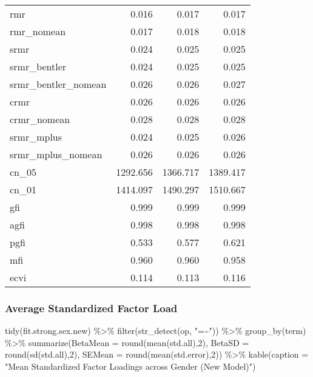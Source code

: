 \documentclass[
  letterpaper,
  DIV=11,
  numbers=noendperiod]{scrartcl}
\newenvironment{Shaded}{\begin{snugshade}}{\end{snugshade}}
\newcommand{\AttributeTok}[1]{\textcolor[rgb]{0.40,0.45,0.13}{#1}}
\newcommand{\DecValTok}[1]{\textcolor[rgb]{0.68,0.00,0.00}{#1}}
\newcommand{\FunctionTok}[1]{\textcolor[rgb]{0.28,0.35,0.67}{#1}}
\newcommand{\NormalTok}[1]{\textcolor[rgb]{0.00,0.23,0.31}{#1}}
\newcommand{\SpecialCharTok}[1]{\textcolor[rgb]{0.37,0.37,0.37}{#1}}
\newcommand{\StringTok}[1]{\textcolor[rgb]{0.13,0.47,0.30}{#1}}
\begin{document}
\begin{longtable}[]{@{}lrrr@{}}
rmr & 0.016 & 0.017 & 0.017 \\
rmr\_nomean & 0.017 & 0.018 & 0.018 \\
srmr & 0.024 & 0.025 & 0.025 \\
srmr\_bentler & 0.024 & 0.025 & 0.025 \\
srmr\_bentler\_nomean & 0.026 & 0.026 & 0.027 \\
crmr & 0.026 & 0.026 & 0.026 \\
crmr\_nomean & 0.028 & 0.028 & 0.028 \\
srmr\_mplus & 0.024 & 0.025 & 0.026 \\
srmr\_mplus\_nomean & 0.026 & 0.026 & 0.026 \\
cn\_05 & 1292.656 & 1366.717 & 1389.417 \\
cn\_01 & 1414.097 & 1490.297 & 1510.667 \\
gfi & 0.999 & 0.999 & 0.999 \\
agfi & 0.998 & 0.998 & 0.998 \\
pgfi & 0.533 & 0.577 & 0.621 \\
mfi & 0.960 & 0.960 & 0.958 \\
ecvi & 0.114 & 0.113 & 0.116 \\
\end{longtable}

\subsubsection{Average Standardized Factor
Load}\label{average-standardized-factor-load}

\begin{Shaded}
\begin{Highlighting}[]
\FunctionTok{tidy}\NormalTok{(fit.strong.sex.new) }\SpecialCharTok{\%\textgreater{}\%}
  \FunctionTok{filter}\NormalTok{(}\FunctionTok{str\_detect}\NormalTok{(op, }\StringTok{"=\textasciitilde{}"}\NormalTok{)) }\SpecialCharTok{\%\textgreater{}\%}
  \FunctionTok{group\_by}\NormalTok{(term) }\SpecialCharTok{\%\textgreater{}\%}
  \FunctionTok{summarize}\NormalTok{(}\AttributeTok{BetaMean =} \FunctionTok{round}\NormalTok{(}\FunctionTok{mean}\NormalTok{(std.all),}\DecValTok{2}\NormalTok{), }
            \AttributeTok{BetaSD =} \FunctionTok{round}\NormalTok{(}\FunctionTok{sd}\NormalTok{(std.all),}\DecValTok{2}\NormalTok{), }
            \AttributeTok{SEMean =} \FunctionTok{round}\NormalTok{(}\FunctionTok{mean}\NormalTok{(std.error),}\DecValTok{2}\NormalTok{)) }\SpecialCharTok{\%\textgreater{}\%}
  \FunctionTok{kable}\NormalTok{(}\AttributeTok{caption =} \StringTok{"Mean Standardized Factor Loadings across Gender (New Model)"}\NormalTok{)}
\end{Highlighting}
\end{Shaded}
\end{document}
